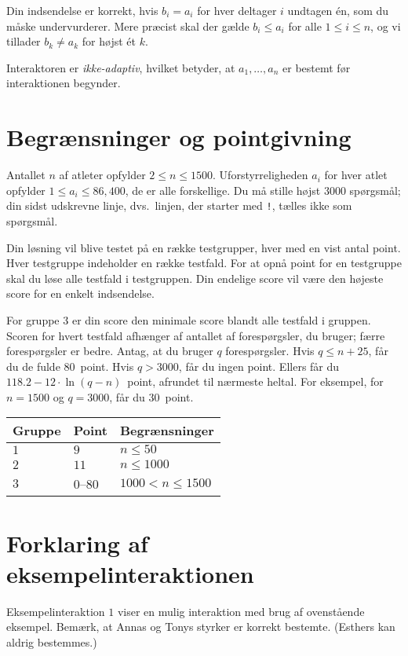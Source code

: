 Din indsendelse er korrekt, hvis $b_i=a_i$ for hver deltager $i$ undtagen én, som du måske undervurderer.
Mere præcist skal der gælde $b_i\leq a_i$ for alle $1\leq i\leq n$, og vi tillader $b_k \neq a_k$ for højst ét $k$.


Interaktoren er \emph{ikke-adaptiv}, hvilket betyder, at $a_1,\ldots, a_n$ er bestemt før interaktionen begynder.

\section*{Begrænsninger og pointgivning}

Antallet $n$ af atleter opfylder
$2\leq n\leq 1500$. %
Uforstyrreligheden $a_i$ for hver atlet opfylder
$1\leq a_i\leq 86,400$, %
de er alle forskellige. %
Du må stille
højst $3000$ spørgsmål; %
din sidst udskrevne linje, dvs.\ linjen, der starter med \texttt{!}, tælles ikke som spørgsmål.

Din løsning vil blive testet på en række testgrupper, hver med en vist antal point.
Hver testgruppe indeholder en række testfald.
For at opnå point for en testgruppe skal du løse alle testfald i testgruppen.
Din endelige score vil være den højeste score for en enkelt indsendelse.

For gruppe $3$ er din score den minimale score blandt alle testfald i gruppen.
Scoren for hvert testfald afhænger af antallet af forespørgsler, du bruger;
færre forespørgsler er bedre.
Antag, at du bruger $q$ forespørgsler.
Hvis $q \le n+25$, får du de fulde $80$~point.
Hvis $q > 3000$, får du ingen point.
Ellers får du
$118.2 - 12 \cdot \ln(q - n)$~point, afrundet til nærmeste heltal. %
For eksempel, for $n = 1500$ og $q = 3000$, får du $30$~point.

\medskip
\begin{tabular}{lll}
Gruppe & Point & Begrænsninger\\\hline
$1$ & $9$ & $n\leq 50$\\
$2$ & $11$ & $n\leq 1000$\\
$3$ & $0$--$80$ & $1000 < n\leq 1500$
\end{tabular}

\section*{Forklaring af eksempelinteraktionen}

Eksempelinteraktion $1$ viser en mulig interaktion med brug af ovenstående eksempel.
Bemærk, at Annas og Tonys styrker er korrekt bestemte.
(Esthers kan aldrig bestemmes.)
